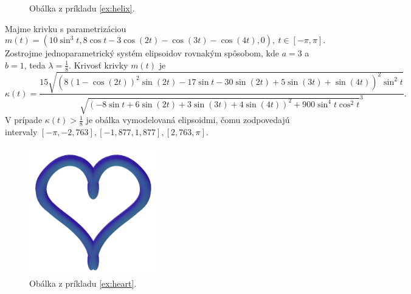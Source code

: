 \begin{example}[Skrutkovica]
\begin{figure}[H]
	\caption[Obálka z príkladu \ref{ex:helix}.]{Obálka z príkladu \ref{ex:helix}.}
\end{figure}
\end{example}
\begin{example}[Srdce]
\label{ex:heart}
Majme krivku s parametrizáciou 
$$m(t)=(10\sin^{3}t, 8 \cos t-3\cos(2t) -\cos(3t)-\cos (4t), 0), \  t \in [-\pi, \pi].$$ Zostrojme jednoparametrický systém elipsoidov rovnakým spôsobom, kde $a= 3$ a $b=1$, teda $\lambda = \frac{1}{8}.$
Krivosť krivky $m(t)$ je
$$
\kappa(t) = \frac{15 \sqrt{\left(8\left(1-\cos\left(2t\right)\right)^{2}\sin\left(2t\right)-17\sin t-30\sin\left(2t\right)+5\sin\left(3t\right)+\sin\left(4t\right)\right)^{2}\sin^{2}t}}
{\sqrt{(-8\sin t + 6 \sin (2t) + 3 \sin (3t) + 4 \sin (4t) ) ^ {2} + 900 \sin^{4} t \cos^{2} t}^{3}}.
$$
V prípade $\kappa(t) > \frac{1}{8}$ je obálka vymodelovaná elipsoidmi, čomu zodpovedajú intervaly $ [-\pi, -2,763], [-1,877, 1,877], [2,763, \pi]. $ 
\begin{figure}[h]
	\centering
	\includegraphics[width=0.5\textwidth]{images/heart_envelope_ellipsoids.png}
	\caption[Obálka z príkladu \ref{ex:heart}.]{Obálka z príkladu \ref{ex:heart}.}
\end{figure}
\end{example}
